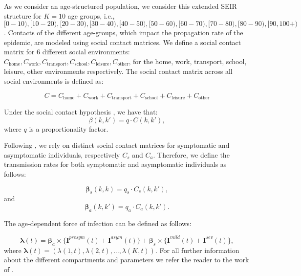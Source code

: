 \documentclass{article}
\renewcommand{\cite}[1]{\citep{#1}}
\newcommand{\ctotal}{C}
\newcommand{\chome}{C_{\text{home}}}
\newcommand{\cwork}{C_{\text{work}}}
\newcommand{\ctransport}{C_{\text{transport}}}
\newcommand{\cschool}{C_{\text{school}}}
\newcommand{\cleisure}{C_{\text{leisure}}}
\newcommand{\cother}{C_{\text{other}}}
\newcommand{\proportionalityfactor}{q}
\newcommand{\agegroup}{k}
\newcommand{\agegroups}{K}
\begin{document}
As we consider an age-structured population, we consider this extended SEIR structure for $\agegroups = 10$ age groups,  i.e., $[0-10), [10-20), [20-30), [30-40), [40-50), [50-60), [60-70), [70-80), [80-90), [90,100+)$. Contacts of the different age-groups, which impact the propagation rate of the epidemic, are modeled using social contact matrices. We define a social contact matrix for 6 different social environments: $\chome, \cwork, \ctransport, \cschool, \cleisure, \cother$, for the home, work, transport, school, leisure, other environments respectively. The social contact matrix across all social environments is defined as:

\begin{equation}
    \ctotal = \chome + \cwork + \ctransport + \cschool + \cleisure + \cother
\end{equation}

Under the social contact hypothesis \cite{wallinga2006using}, we have that:
%
\begin{equation}
\beta(\agegroup,\agegroup') = \proportionalityfactor \cdot \ctotal(\agegroup,\agegroup'),
\end{equation}
%
where $\proportionalityfactor$ is a proportionality factor.

Following \citet{abrams2021modelling}, we rely on distinct social contact matrices for symptomatic and asymptomatic individuals, respectively $\ctotal_{s}$ and $\ctotal_{a}$. Therefore, we define the transmission rates for both symptomatic and asymptomatic individuals as follows:

\begin{equation}
\boldsymbol{\beta}_{s}(\agegroup, \agegroup) = \proportionalityfactor_{s} \cdot C_{s}(\agegroup, \agegroup'),    
\end{equation}
and
\begin{equation}
\boldsymbol{\beta}_{a}(\agegroup, \agegroup') = \proportionalityfactor_{a} \cdot C_{a}(\agegroup, \agegroup').  
\end{equation}

The age-dependent force of infection can be defined as follows:

\begin{equation}
    \boldsymbol{\lambda}(t) = \boldsymbol{\beta}_{a} \times \{ \textbf{I}^{presym}(t) + \textbf{I}^{asym}(t) \} +
    \boldsymbol{\beta}_{s} \times \{ \textbf{I}^{mild}(t) + \textbf{I}^{sev}(t) \},
\end{equation}
%
where $\boldsymbol{\lambda}(t) = (\lambda(1, t), \lambda(2, t), ..., \lambda(\agegroups, t))$. For all further information about the different compartments and parameters we refer the reader to the work of \citet{abrams2021modelling}.
\end{document}
